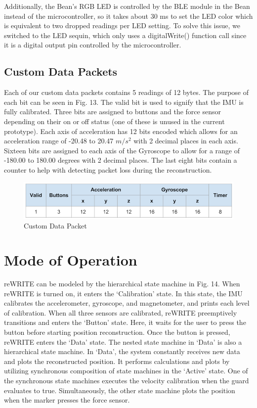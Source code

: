 \documentclass[10pt,journal]{IEEEtran}
\begin{document}
\par Additionally, the Bean's RGB LED is controlled by the BLE module in the Bean instead of the microcontroller, so it takes about 30 ms to set the LED color which is equivalent to two dropped readings per LED setting. To solve this issue, we switched to the LED sequin, which only uses a digitalWrite() function call since it is a digital output pin controlled by the microcontroller. 
  

\subsection{Custom Data Packets}
Each of our custom data packets contains 5 readings of 12 bytes. The purpose of each bit can be seen in Fig. 13. The valid bit is used to signify that the IMU is fully calibrated. Three bits are assigned to buttons and the force sensor depending on their on or off status (one of these is unused in the current prototype). Each axis of acceleration has 12 bits encoded which allows for an acceleration range of -20.48 to 20.47 $m/s^2$ with 2 decimal places in each axis. Sixteen bits are assigned to each axis of the Gyroscope to allow for a range of -180.00 to 180.00 degrees with 2 decimal places. The last eight bits contain a counter to help with detecting packet loss during the reconstruction.

\begin{figure}[h]
  \centering
    \includegraphics[width=\linewidth]{figures/packet}
  		\caption{Custom Data Packet}
  	\label{fig:packet}
\end{figure}

\section{Mode of Operation}
reWRITE can be modeled by the hierarchical state machine in Fig. 14. When reWRITE is turned on, it enters the ‘Calibration’ state. In this state, the IMU calibrates the accelerometer, gyroscope, and magnetometer, and prints each level of calibration. When all three sensors are calibrated, reWRITE preemptively transitions and enters the ‘Button’ state. Here, it waits for the user to press the button before starting position reconstruction. Once the button is pressed, reWRITE enters the ‘Data’ state. The nested state machine in ‘Data’ is also a hierarchical state machine. In ‘Data’, the system constantly receives new data and plots the reconstructed position. It performs calculations and plots by utilizing synchronous composition of state machines in the ‘Active’ state. One of the synchronous state machines executes the velocity calibration when the guard evaluates to true. Simultaneously, the other state machine plots the position when the marker presses the force sensor.
\end{document}
